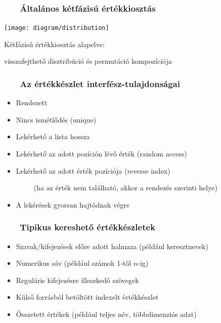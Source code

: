 \documentclass[
]{beamer}
\newcommand{\slidetitle}[2]{\frametitle{{\small #1 ~ \ding{226} ~ } \normalsize \textbf{#2} }}
\begin{document}
\begin{frame}
    \slidetitle{\sectionshorttitle}{Általános kétfázisú értékkiosztás}
    
    \centering
    
    \texttt{[image: diagram/distribution]}
    
    Kétfázisú értékkiosztás alapelve: \par
    visszafejthető disztribúció és permutáció kompozíciója
\end{frame}

\begin{frame}
    \slidetitle{\sectionshorttitle}{Az értékkészlet interfész-tulajdonságai}
    
    \begin{itemize}
        \setlength\itemsep{1em}
        \pause \item Rendezett
        \pause \item Nincs ismétlődés (unique)
        \pause \item Lekérhető a lista hossza
        \pause \item Lekérhető az adott pozíción lévő érték (random access)
        \pause \item Lekérhető az adott érték pozíciója (reverse index) \par
              \pause ~ ~ ~ (ha az érték nem található, akkor a rendezés szerinti helye)
        \pause \item A lekérések gyorsan hajtódnak végre
    \end{itemize}
\end{frame}

\begin{frame}
    \slidetitle{\sectionshorttitle}{Tipikus kereshető értékkészletek}
    
    \begin{itemize}
        \setlength\itemsep{1em}
        \pause \item Szavak/kifejezések előre adott halmaza (például keresztnevek)
        \pause \item Numerikus sáv (például számok 1-től $n$-ig)
        \pause \item Reguláris kifejezésre illeszkedő szövegek
        \pause \item Külső forrásból betöltött indexelt értékkészlet
        \pause \item Összetett értékek (például teljes név, többdimenziós adat)
    \end{itemize}
\end{frame}
\end{document}
